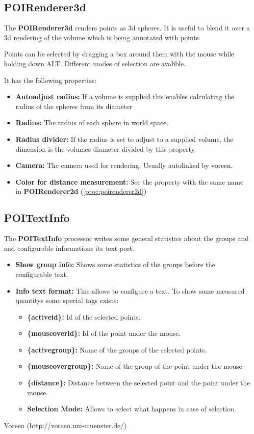 \documentclass[
    fontsize=12pt,
    paper=a4,
    pagesize=auto,
    parskip=false,
    titlepage=on,
    english
]{scrartcl}
\begin{document}
\subsection{POIRenderer3d}
The \textbf{POIRenderer3d} renders points as 3d spheres. It is useful to blend it over a 3d rendering of the volume which is being annotated with points. 

Points can be selected by dragging a box around them with the mouse while holding down ALT. Different modes of selection are avalible.

It has the following properties:
\begin{itemize}
	\item \textbf{Autoadjust radius:} If a volume is supplied this enables calculating the radius of the spheres from its diameter
	\item \textbf{Radius:} The radius of each sphere in world space.
	\item \textbf{Radius divider:} If the radius is set to adjust to a supplied volume, the dimension is the volumes diameter divided by this property.
	\item \textbf{Camera:} The camera used for rendering. Usually autolinked by voreen.
	\item \textbf{Color for distance measurement:} See the property with the same name in \textbf{POIRenderer2d} (\ref{proc:poirenderer2d})
\end{itemize}
\subsection{POITextInfo}
The \textbf{POITextInfo} processor writes some general statistics about the groups and and configurable informations its text port.
\begin{itemize}
	\item \textbf{Show group info:} Shows some statistics of the groups before the configurable text.
	\item \textbf{Info text format:} This allows to configure a text. To show some measured quantitys some special tags exists:
	\begin{itemize}
		\item \textbf{\{activeid\}:} Id of the selected points.
	    \item \textbf{\{mouseoverid\}:} Id of the point under the mouse.
	    \item \textbf{\{activegroup\}:} Name of the groups of the selected points.
	    \item \textbf{\{mouseovergroup\}:} Name of the group of the point under the mouse.
	    \item \textbf{\{distance\}:} Distance between the selected point and the point under the mouse.
	    \item \textbf{Selection Mode:} Allows to select what happens in case of selection.
	\end{itemize}
\end{itemize}
\begin{thebibliography}{9}


 Voreen (http://voreen.uni-muenster.de/)
\end{thebibliography}
\end{document}
